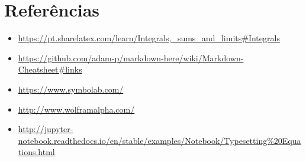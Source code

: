 \documentclass[11pt]{article}
\providecommand{\tightlist}{%
      \setlength{\itemsep}{0pt}\setlength{\parskip}{0pt}}
\begin{document}
\begin{Verbatim}[commandchars=\\\{\}]
    \end{Verbatim}

    \hypertarget{referuxeancias}{%
\section{Referências}\label{referuxeancias}}

    \begin{itemize}
\tightlist
\item
  \url{https://pt.sharelatex.com/learn/Integrals,_sums_and_limits\#Integrals}
\item
  \url{https://github.com/adam-p/markdown-here/wiki/Markdown-Cheatsheet\#links}
\item
  \url{https://www.symbolab.com/}
\item
  \url{http://www.wolframalpha.com/}
\item
  \url{http://jupyter-notebook.readthedocs.io/en/stable/examples/Notebook/Typesetting\%20Equations.html}
\end{itemize}


    
    
    
    
\end{document}
